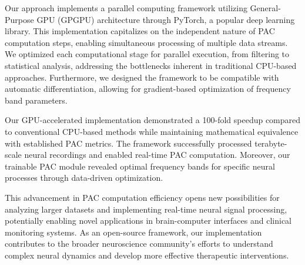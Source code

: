 Our approach implements a parallel computing framework utilizing General-Purpose GPU (GPGPU) architecture through PyTorch, a popular deep learning library. This implementation capitalizes on the independent nature of PAC computation steps, enabling simultaneous processing of multiple data streams. We optimized each computational stage for parallel execution, from filtering to statistical analysis, addressing the bottlenecks inherent in traditional CPU-based approaches. Furthermore, we designed the framework to be compatible with automatic differentiation, allowing for gradient-based optimization of frequency band parameters.

Our GPU-accelerated implementation demonstrated a 100-fold speedup compared to conventional CPU-based methods while maintaining mathematical equivalence with established PAC metrics. The framework successfully processed terabyte-scale neural recordings and enabled real-time PAC computation. Moreover, our trainable PAC module revealed optimal frequency bands for specific neural processes through data-driven optimization.

This advancement in PAC computation efficiency opens new possibilities for analyzing larger datasets and implementing real-time neural signal processing, potentially enabling novel applications in brain-computer interfaces and clinical monitoring systems. As an open-source framework, our implementation contributes to the broader neuroscience community's efforts to understand complex neural dynamics and develop more effective therapeutic interventions.

\label{sec:introduction}

